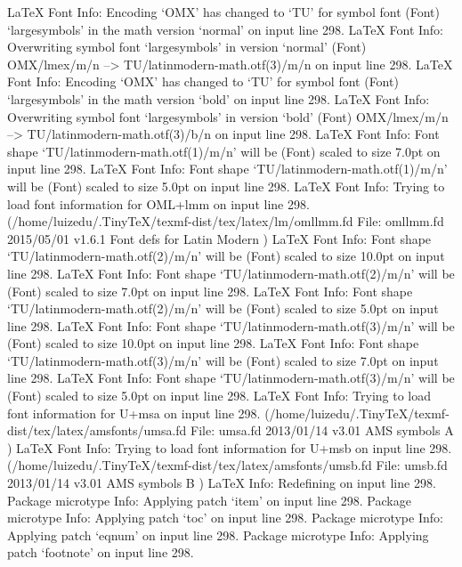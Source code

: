 LaTeX Font Info:    Encoding `OMX' has changed to `TU' for symbol font
(Font)              `largesymbols' in the math version `normal' on input line 298.
LaTeX Font Info:    Overwriting symbol font `largesymbols' in version `normal'
(Font)                  OMX/lmex/m/n --> TU/latinmodern-math.otf(3)/m/n on input line 298.
LaTeX Font Info:    Encoding `OMX' has changed to `TU' for symbol font
(Font)              `largesymbols' in the math version `bold' on input line 298.
LaTeX Font Info:    Overwriting symbol font `largesymbols' in version `bold'
(Font)                  OMX/lmex/m/n --> TU/latinmodern-math.otf(3)/b/n on input line 298.
LaTeX Font Info:    Font shape `TU/latinmodern-math.otf(1)/m/n' will be
(Font)              scaled to size 7.0pt on input line 298.
LaTeX Font Info:    Font shape `TU/latinmodern-math.otf(1)/m/n' will be
(Font)              scaled to size 5.0pt on input line 298.
LaTeX Font Info:    Trying to load font information for OML+lmm on input line 298.
(/home/luizedu/.TinyTeX/texmf-dist/tex/latex/lm/omllmm.fd
File: omllmm.fd 2015/05/01 v1.6.1 Font defs for Latin Modern
)
LaTeX Font Info:    Font shape `TU/latinmodern-math.otf(2)/m/n' will be
(Font)              scaled to size 10.0pt on input line 298.
LaTeX Font Info:    Font shape `TU/latinmodern-math.otf(2)/m/n' will be
(Font)              scaled to size 7.0pt on input line 298.
LaTeX Font Info:    Font shape `TU/latinmodern-math.otf(2)/m/n' will be
(Font)              scaled to size 5.0pt on input line 298.
LaTeX Font Info:    Font shape `TU/latinmodern-math.otf(3)/m/n' will be
(Font)              scaled to size 10.0pt on input line 298.
LaTeX Font Info:    Font shape `TU/latinmodern-math.otf(3)/m/n' will be
(Font)              scaled to size 7.0pt on input line 298.
LaTeX Font Info:    Font shape `TU/latinmodern-math.otf(3)/m/n' will be
(Font)              scaled to size 5.0pt on input line 298.
LaTeX Font Info:    Trying to load font information for U+msa on input line 298.
(/home/luizedu/.TinyTeX/texmf-dist/tex/latex/amsfonts/umsa.fd
File: umsa.fd 2013/01/14 v3.01 AMS symbols A
)
LaTeX Font Info:    Trying to load font information for U+msb on input line 298.
(/home/luizedu/.TinyTeX/texmf-dist/tex/latex/amsfonts/umsb.fd
File: umsb.fd 2013/01/14 v3.01 AMS symbols B
)
LaTeX Info: Redefining \microtypecontext on input line 298.
Package microtype Info: Applying patch `item' on input line 298.
Package microtype Info: Applying patch `toc' on input line 298.
Package microtype Info: Applying patch `eqnum' on input line 298.
Package microtype Info: Applying patch `footnote' on input line 298.
